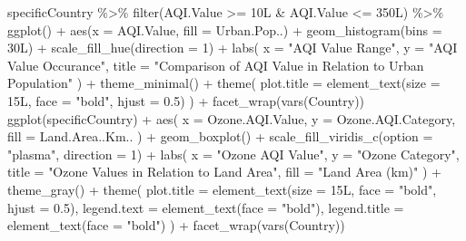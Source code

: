 \documentclass[
  letterpaper,
  DIV=11,
  numbers=noendperiod]{scrartcl}
\newenvironment{Shaded}{\begin{snugshade}}{\end{snugshade}}
\newcommand{\AttributeTok}[1]{\textcolor[rgb]{0.40,0.45,0.13}{#1}}
\newcommand{\DecValTok}[1]{\textcolor[rgb]{0.68,0.00,0.00}{#1}}
\newcommand{\FloatTok}[1]{\textcolor[rgb]{0.68,0.00,0.00}{#1}}
\newcommand{\FunctionTok}[1]{\textcolor[rgb]{0.28,0.35,0.67}{#1}}
\newcommand{\NormalTok}[1]{\textcolor[rgb]{0.00,0.23,0.31}{#1}}
\newcommand{\SpecialCharTok}[1]{\textcolor[rgb]{0.37,0.37,0.37}{#1}}
\newcommand{\StringTok}[1]{\textcolor[rgb]{0.13,0.47,0.30}{#1}}
\begin{document}
\begin{Shaded}
\begin{Highlighting}[]
\NormalTok{specificCountry }\SpecialCharTok{\%\textgreater{}\%}
 \FunctionTok{filter}\NormalTok{(AQI.Value }\SpecialCharTok{\textgreater{}=} \DecValTok{10}\NormalTok{L }\SpecialCharTok{\&}\NormalTok{ AQI.Value }\SpecialCharTok{\textless{}=} \DecValTok{350}\NormalTok{L) }\SpecialCharTok{\%\textgreater{}\%}
 \FunctionTok{ggplot}\NormalTok{() }\SpecialCharTok{+}
  \FunctionTok{aes}\NormalTok{(}\AttributeTok{x =}\NormalTok{ AQI.Value, }\AttributeTok{fill =}\NormalTok{ Urban.Pop..) }\SpecialCharTok{+}
  \FunctionTok{geom\_histogram}\NormalTok{(}\AttributeTok{bins =} \DecValTok{30}\NormalTok{L) }\SpecialCharTok{+}
  \FunctionTok{scale\_fill\_hue}\NormalTok{(}\AttributeTok{direction =} \DecValTok{1}\NormalTok{) }\SpecialCharTok{+}
  \FunctionTok{labs}\NormalTok{(}
    \AttributeTok{x =} \StringTok{"AQI Value Range"}\NormalTok{,}
    \AttributeTok{y =} \StringTok{"AQI Value Occurance"}\NormalTok{,}
    \AttributeTok{title =} \StringTok{"Comparison of AQI Value in Relation to Urban Population"}
\NormalTok{  ) }\SpecialCharTok{+}
  \FunctionTok{theme\_minimal}\NormalTok{() }\SpecialCharTok{+}
  \FunctionTok{theme}\NormalTok{(}
    \AttributeTok{plot.title =} \FunctionTok{element\_text}\NormalTok{(}\AttributeTok{size =} \DecValTok{15}\NormalTok{L,}
    \AttributeTok{face =} \StringTok{"bold"}\NormalTok{,}
    \AttributeTok{hjust =} \FloatTok{0.5}\NormalTok{)}
\NormalTok{  ) }\SpecialCharTok{+}
  \FunctionTok{facet\_wrap}\NormalTok{(}\FunctionTok{vars}\NormalTok{(Country))}
\FunctionTok{ggplot}\NormalTok{(specificCountry) }\SpecialCharTok{+}
  \FunctionTok{aes}\NormalTok{(}
    \AttributeTok{x =}\NormalTok{ Ozone.AQI.Value,}
    \AttributeTok{y =}\NormalTok{ Ozone.AQI.Category,}
    \AttributeTok{fill =}\NormalTok{ Land.Area..Km..}
\NormalTok{  ) }\SpecialCharTok{+}
  \FunctionTok{geom\_boxplot}\NormalTok{() }\SpecialCharTok{+}
  \FunctionTok{scale\_fill\_viridis\_c}\NormalTok{(}\AttributeTok{option =} \StringTok{"plasma"}\NormalTok{, }\AttributeTok{direction =} \DecValTok{1}\NormalTok{) }\SpecialCharTok{+}
  \FunctionTok{labs}\NormalTok{(}
    \AttributeTok{x =} \StringTok{"Ozone AQI Value"}\NormalTok{,}
    \AttributeTok{y =} \StringTok{"Ozone Category"}\NormalTok{,}
    \AttributeTok{title =} \StringTok{"Ozone Values in Relation to Land Area"}\NormalTok{,}
    \AttributeTok{fill =} \StringTok{"Land Area (km)"}
\NormalTok{  ) }\SpecialCharTok{+}
  \FunctionTok{theme\_gray}\NormalTok{() }\SpecialCharTok{+}
  \FunctionTok{theme}\NormalTok{(}
    \AttributeTok{plot.title =} \FunctionTok{element\_text}\NormalTok{(}\AttributeTok{size =} \DecValTok{15}\NormalTok{L,}
    \AttributeTok{face =} \StringTok{"bold"}\NormalTok{,}
    \AttributeTok{hjust =} \FloatTok{0.5}\NormalTok{),}
    \AttributeTok{legend.text =} \FunctionTok{element\_text}\NormalTok{(}\AttributeTok{face =} \StringTok{"bold"}\NormalTok{),}
    \AttributeTok{legend.title =} \FunctionTok{element\_text}\NormalTok{(}\AttributeTok{face =} \StringTok{"bold"}\NormalTok{)}
\NormalTok{  ) }\SpecialCharTok{+}
  \FunctionTok{facet\_wrap}\NormalTok{(}\FunctionTok{vars}\NormalTok{(Country))}
\end{Highlighting}
\end{Shaded}
\end{document}
